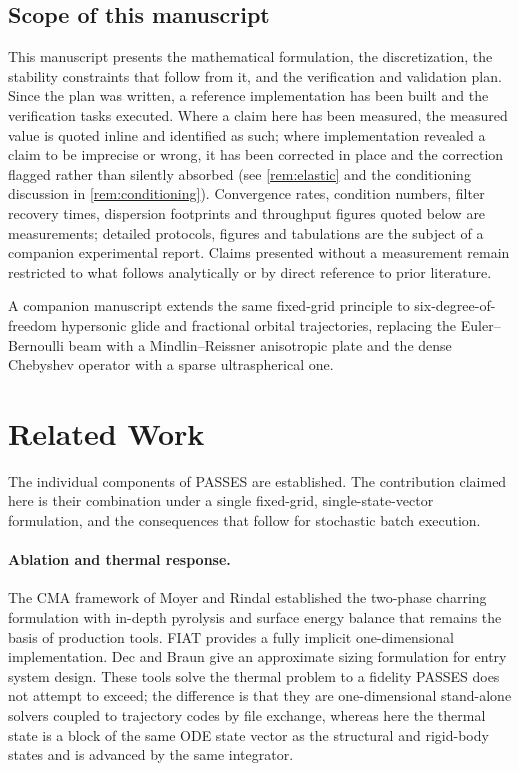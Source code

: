 \documentclass[11pt,a4paper]{article}
\theoremstyle{definition}
\numberwithin{equation}{section}
\begin{document}
\subsection{Scope of this manuscript}
\label{sec:scope}

This manuscript presents the mathematical formulation, the discretization, the stability constraints that follow from it, and the verification and validation plan. Since the plan was written, a reference implementation has been built and the verification tasks executed. Where a claim here has been measured, the measured value is quoted inline and identified as such; where implementation revealed a claim to be imprecise or wrong, it has been corrected in place and the correction flagged rather than silently absorbed (see \cref{rem:elastic} and the conditioning discussion in \cref{rem:conditioning}). Convergence rates, condition numbers, filter recovery times, dispersion footprints and throughput figures quoted below are measurements; detailed protocols, figures and tabulations are the subject of a companion experimental report. Claims presented without a measurement remain restricted to what follows analytically or by direct reference to prior literature.

A companion manuscript \cite{knox2026hgv} extends the same fixed-grid principle to six-degree-of-freedom hypersonic glide and fractional orbital trajectories, replacing the Euler--Bernoulli beam with a Mindlin--Reissner anisotropic plate and the dense Chebyshev operator with a sparse ultraspherical one.

\section{Related Work}
\label{sec:related}

The individual components of PASSES are established. The contribution claimed here is their combination under a single fixed-grid, single-state-vector formulation, and the consequences that follow for stochastic batch execution.

\paragraph{Ablation and thermal response.} The CMA framework of Moyer and Rindal \cite{moyer1968} established the two-phase charring formulation with in-depth pyrolysis and surface energy balance that remains the basis of production tools. FIAT \cite{chen1999} provides a fully implicit one-dimensional implementation. Dec and Braun \cite{dec2006} give an approximate sizing formulation for entry system design. These tools solve the thermal problem to a fidelity PASSES does not attempt to exceed; the difference is that they are one-dimensional stand-alone solvers coupled to trajectory codes by file exchange, whereas here the thermal state is a block of the same ODE state vector as the structural and rigid-body states and is advanced by the same integrator.
\end{document}
